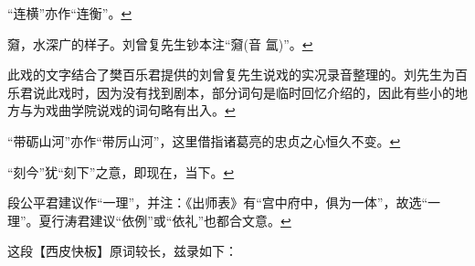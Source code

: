   ``连横''亦作``连衡''。\protect\hyperlink{fnref274}{↩}
\item
  \leavevmode\hypertarget{fn275}{}%
  奫，水深广的样子。刘曾复先生钞本注``奫(音
  氲)''。\protect\hyperlink{fnref275}{↩}
\item
  \leavevmode\hypertarget{fn276}{}%
  此戏的文字结合了樊百乐君提供的刘曾复先生说戏的实况录音整理的。刘先生为百乐君说此戏时，因为没有找到剧本，部分词句是临时回忆介绍的，因此有些小的地方与为戏曲学院说戏的词句略有出入。\protect\hyperlink{fnref276}{↩}
\item
  \leavevmode\hypertarget{fn277}{}%
  ``带砺山河''亦作``带厉山河''，这里借指诸葛亮的忠贞之心恒久不变。\protect\hyperlink{fnref277}{↩}
\item
  \leavevmode\hypertarget{fn278}{}%
  ``刻今''犹``刻下''之意，即现在，当下。\protect\hyperlink{fnref278}{↩}
\item
  \leavevmode\hypertarget{fn279}{}%
  段公平君建议作``一理''，并注：《出师表》有``宫中府中，俱为一体''，故选``一理''。夏行涛君建议``依例''或``依礼''也都合文意。\protect\hyperlink{fnref279}{↩}
\item
  \leavevmode\hypertarget{fn280}{}%
  这段【西皮快板】原词较长，兹录如下：

